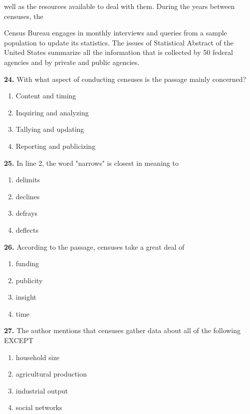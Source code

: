 \documentclass[12pt]{article}
\begin{document}
well as the resources available to deal with them. During the years between censuses, the\par
Census Bureau engages in monthly interviews and queries from a sample population to update its statistics. The issues of Statistical Abstract of the United States summarize all the information that is collected by 50 federal agencies and by private and public agencies.\par
\endgroup
\medskip
\noindent\textbf{24.} With what aspect of conducting censuses is the passage mainly concerned?
\begin{enumerate}[label=(\Alph*),leftmargin=*,itemsep=0.2em]
\item Content and timing
\item Inquiring and analyzing
\item Tallying and updating
\item Reporting and publicizing
\end{enumerate}
\par
\vspace{0.25\baselineskip}
\noindent\textbf{25.} In line 2, the word "narrows" is closest in meaning to
\begin{enumerate}[label=(\Alph*),leftmargin=*,itemsep=0.2em]
\item delimits
\item declines
\item defrays
\item deflects
\end{enumerate}
\par
\vspace{0.25\baselineskip}
\noindent\textbf{26.} According to the passage, censuses take a great deal of
\begin{enumerate}[label=(\Alph*),leftmargin=*,itemsep=0.2em]
\item funding
\item publicity
\item insight
\item time
\end{enumerate}
\par
\vspace{0.25\baselineskip}
\noindent\textbf{27.} The author mentions that censuses gather data about all of the following EXCEPT
\begin{enumerate}[label=(\Alph*),leftmargin=*,itemsep=0.2em]
\item household size
\item agricultural production
\item industrial output
\item social networks
\end{enumerate}
\end{document}
